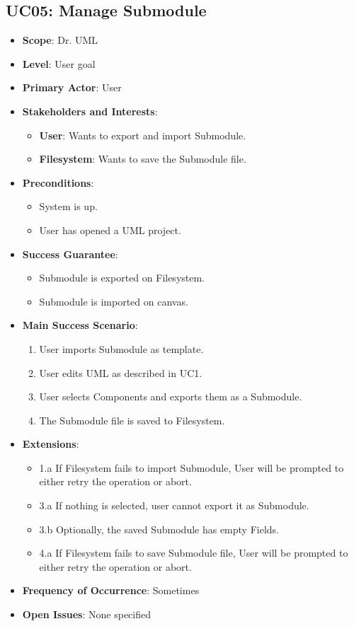 \documentclass[12pt]{article}
\begin{document}
\subsection{UC05: Manage Submodule}
\begin{itemize}
    \item \textbf{Scope}: Dr. UML
    \item \textbf{Level}: User goal
    \item \textbf{Primary Actor}: User
    \item \textbf{Stakeholders and Interests}:
    \begin{itemize}
        \item \textbf{User}: Wants to export and import Submodule.
        \item \textbf{Filesystem}: Wants to save the Submodule file.
    \end{itemize}
    \item \textbf{Preconditions}:
    \begin{itemize}
        \item System is up.
        \item User has opened a UML project.
    \end{itemize}
    \item \textbf{Success Guarantee}:
    \begin{itemize}
        \item Submodule is exported on Filesystem.
        \item Submodule is imported on canvas.
    \end{itemize}
    \item \textbf{Main Success Scenario}:
    \begin{enumerate}
        \item User imports Submodule as template.
        \item User edits UML as described in UC1.
        \item User selects Components and exports them as a Submodule.
        \item The Submodule file is saved to Filesystem.
    \end{enumerate}
    \item \textbf{Extensions}:
    \begin{itemize}
        \item 1.a If Filesystem fails to import Submodule, User will be prompted to either retry the operation or abort.
        \item 3.a If nothing is selected, user cannot export it as Submodule.
        \item 3.b Optionally, the saved Submodule has empty Fields.
        \item 4.a If Filesystem fails to save Submodule file, User will be prompted to either retry the operation or abort.
    \end{itemize}
    \item \textbf{Frequency of Occurrence}: Sometimes
    \item \textbf{Open Issues}: None specified
\end{itemize}
\end{document}
